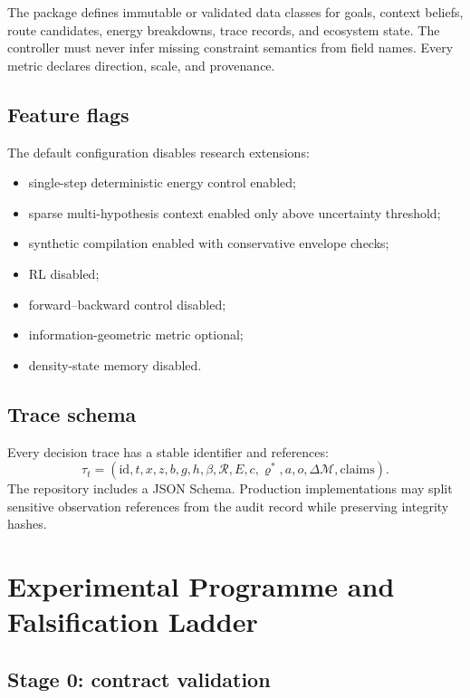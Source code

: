 \documentclass[10pt]{article}
\newcommand{\M}{\mathcal{M}}
\newcommand{\Rset}{\mathcal{R}}
\begin{document}
The package defines immutable or validated data classes for goals, context beliefs, route candidates, energy breakdowns, trace records, and ecosystem state. The controller must never infer missing constraint semantics from field names. Every metric declares direction, scale, and provenance.

\subsection{Feature flags}

The default configuration disables research extensions:
\begin{itemize}
  \item single-step deterministic energy control enabled;
  \item sparse multi-hypothesis context enabled only above uncertainty threshold;
  \item synthetic compilation enabled with conservative envelope checks;
  \item RL disabled;
  \item forward--backward control disabled;
  \item information-geometric metric optional;
  \item density-state memory disabled.
\end{itemize}

\subsection{Trace schema}

Every decision trace has a stable identifier and references:
\begin{equation}
  \tau_t=(\mathrm{id},t,x,z,b,g,h,\beta,\Rset,E,c,\varrho^*,a,o,\Delta\M,\mathrm{claims}).
\end{equation}
The repository includes a JSON Schema. Production implementations may split sensitive observation references from the audit record while preserving integrity hashes.

\section{Experimental Programme and Falsification Ladder}

\subsection{Stage 0: contract validation}
\end{document}
